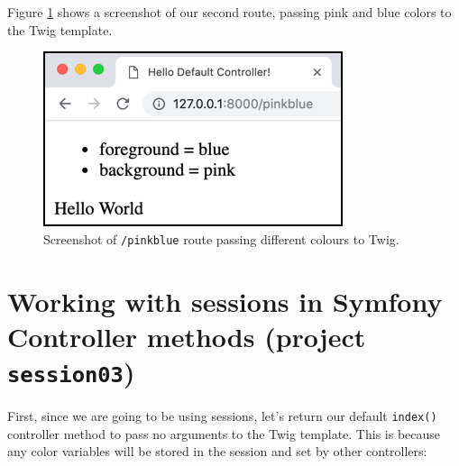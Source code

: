 \documentclass[a4paperpaper,openright]{book}
\newenvironment{Shaded}{}{}
\newcommand{\AnnotationTok}[1]{\textcolor[rgb]{0.38,0.63,0.69}{\textbf{\textit{#1}}}}
\newcommand{\CommentTok}[1]{\textcolor[rgb]{0.38,0.63,0.69}{\textit{#1}}}
\newcommand{\KeywordTok}[1]{\textcolor[rgb]{0.00,0.44,0.13}{\textbf{#1}}}
\newcommand{\NormalTok}[1]{#1}
\newcommand{\OtherTok}[1]{\textcolor[rgb]{0.00,0.44,0.13}{#1}}
\newcommand{\StringTok}[1]{\textcolor[rgb]{0.25,0.44,0.63}{#1}}
\begin{document}
Figure \ref{twig_colours} shows a screenshot of our second route,
passing pink and blue colors to the Twig template.

\begin{figure}
\centering
\includegraphics{./tex2pdf.-65f13e14688ab55b/208cfa06fb9ee48e693def7d3b21bfe0a1bed489.png}
\caption{Screenshot of \texttt{/pinkblue} route passing different
colours to Twig. \label{twig_colours}}
\end{figure}

\hypertarget{working-with-sessions-in-symfony-controller-methods-project-session03}{%
\section{\texorpdfstring{Working with sessions in Symfony Controller
methods (project
\texttt{session03})}{Working with sessions in Symfony Controller methods (project session03)}}\label{working-with-sessions-in-symfony-controller-methods-project-session03}}

First, since we are going to be using sessions, let's return our default
\texttt{index()} controller method to pass no arguments to the Twig
template. This is because any color variables will be stored in the
session and set by other controllers:

\begin{Shaded}
\end{Shaded}
\end{document}
